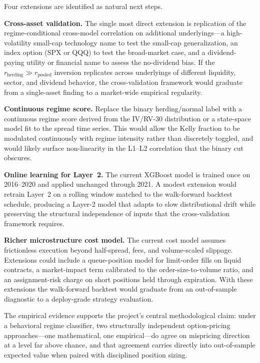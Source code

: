 \documentclass[12pt, letterpaper]{article}
\begin{document}
Four extensions are identified as natural next steps.

\textbf{Cross-asset validation.} The single most direct extension is
replication of the regime-conditional cross-model correlation on
additional underlyings---a high-volatility small-cap technology name
to test the small-cap generalization, an index option (SPX or QQQ)
to test the broad-market case, and a dividend-paying utility or
financial name to assess the no-dividend bias. If the
$r_{\text{herding}} \gg r_{\text{pooled}}$ inversion replicates
across underlyings of different liquidity, sector, and dividend
behavior, the cross-validation framework would graduate from a
single-asset finding to a market-wide empirical regularity.

\textbf{Continuous regime score.} Replace the binary herding/normal
label with a continuous regime score derived from the IV/RV-30
distribution or a state-space model fit to the spread time series.
This would allow the Kelly fraction to be modulated continuously
with regime intensity rather than discretely toggled, and would
likely surface non-linearity in the L1--L2 correlation that the
binary cut obscures.

\textbf{Online learning for Layer~2.} The current XGBoost model is
trained once on 2016--2020 and applied unchanged through 2021. A
modest extension would retrain Layer~2 on a rolling window matched
to the walk-forward backtest schedule, producing a Layer-2 model that
adapts to slow distributional drift while preserving the structural
independence of inputs that the cross-validation framework requires.

\textbf{Richer microstructure cost model.} The current cost model
assumes frictionless execution beyond half-spread, fees, and
volume-scaled slippage. Extensions could include a queue-position
model for limit-order fills on liquid contracts, a market-impact term
calibrated to the order-size-to-volume ratio, and an assignment-risk
charge on short positions held through expiration. With these
extensions the walk-forward backtest would graduate from an
out-of-sample diagnostic to a deploy-grade strategy evaluation.

\medskip

The empirical evidence supports the project's central methodological
claim: under a behavioral regime classifier, two structurally
independent option-pricing approaches---one mathematical, one
empirical---do agree on mispricing direction at a level far above
chance, and that agreement carries directly into out-of-sample
expected value when paired with disciplined position sizing.
\end{document}
